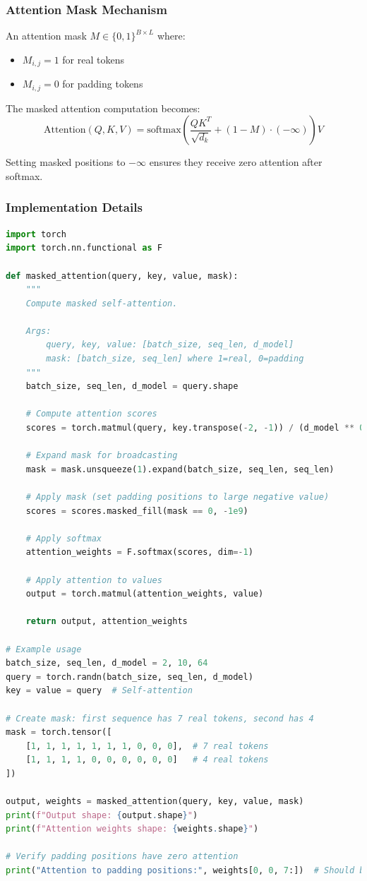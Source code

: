 \subsubsection{Attention Mask Mechanism}
An attention mask $M \in \{0, 1\}^{B \times L}$ where:
\begin{itemize}
\item $M_{i,j} = 1$ for real tokens
\item $M_{i,j} = 0$ for padding tokens
\end{itemize}

The masked attention computation becomes:
$$\text{Attention}(Q, K, V) = \text{softmax}\left(\frac{QK^T}{\sqrt{d_k}} + (1-M) \cdot (-\infty)\right)V$$

Setting masked positions to $-\infty$ ensures they receive zero attention after softmax.

\subsubsection{Implementation Details}
\begin{lstlisting}[language=Python, caption=Attention Masking]
import torch
import torch.nn.functional as F

def masked_attention(query, key, value, mask):
    """
    Compute masked self-attention.
    
    Args:
        query, key, value: [batch_size, seq_len, d_model]
        mask: [batch_size, seq_len] where 1=real, 0=padding
    """
    batch_size, seq_len, d_model = query.shape
    
    # Compute attention scores
    scores = torch.matmul(query, key.transpose(-2, -1)) / (d_model ** 0.5)
    
    # Expand mask for broadcasting
    mask = mask.unsqueeze(1).expand(batch_size, seq_len, seq_len)
    
    # Apply mask (set padding positions to large negative value)
    scores = scores.masked_fill(mask == 0, -1e9)
    
    # Apply softmax
    attention_weights = F.softmax(scores, dim=-1)
    
    # Apply attention to values
    output = torch.matmul(attention_weights, value)
    
    return output, attention_weights

# Example usage
batch_size, seq_len, d_model = 2, 10, 64
query = torch.randn(batch_size, seq_len, d_model)
key = value = query  # Self-attention

# Create mask: first sequence has 7 real tokens, second has 4
mask = torch.tensor([
    [1, 1, 1, 1, 1, 1, 1, 0, 0, 0],  # 7 real tokens
    [1, 1, 1, 1, 0, 0, 0, 0, 0, 0]   # 4 real tokens
])

output, weights = masked_attention(query, key, value, mask)
print(f"Output shape: {output.shape}")
print(f"Attention weights shape: {weights.shape}")

# Verify padding positions have zero attention
print("Attention to padding positions:", weights[0, 0, 7:])  # Should be ~0
\end{lstlisting}

